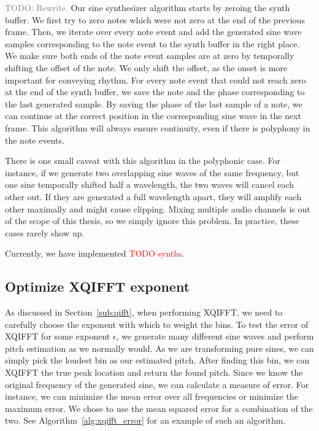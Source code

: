 \documentclass[a4paper,10pt,twocolumn]{article}
\begin{document}
\textcolor{gray}{TODO: Rewrite. }
Our sine synthesizer algorithm starts by zeroing the synth buffer. We first try to zero notes which were not zero at the end of the previous frame. Then, we iterate over every note event and add the generated sine wave samples corresponding to the note event to the synth buffer in the right place. We make sure both ends of the note event samples are at zero by temporally shifting the offset of the note. We only shift the offset, as the onset is more important for conveying rhythm. For every note event that could not reach zero at the end of the synth buffer, we save the note and the phase corresponding to the last generated sample. By saving the phase of the last sample of a note, we can continue at the correct position in the corresponding sine wave in the next frame. This algorithm will always ensure continuity, even if there is polyphony in the note events.

There is one small caveat with this algorithm in the polyphonic case. For instance, if we generate two overlapping sine waves of the same frequency, but one sine temporally shifted half a wavelength, the two waves will cancel each other out. If they are generated a full wavelength apart, they will amplify each other maximally and might cause clipping. Mixing multiple audio channels is out of the scope of this thesis, so we simply ignore this problem. In practice, these cases rarely show up.


Currently, we have implemented \textcolor{red}{TODO synths}. %


\subsection{Optimize XQIFFT exponent}  \label{sub:opt_xqfft}
As discussed in Section~\ref{sub:qifft}, when performing XQIFFT, we need to carefully choose the exponent with which to weight the bins. To test the error of XQIFFT for some exponent $\epsilon$, we generate many different sine waves and perform pitch estimation as we normally would. As we are transforming pure sines, we can simply pick the loudest bin as our estimated pitch. After finding this bin, we can XQIFFT the true peak location and return the found pitch. Since we know the original frequency of the generated sine, we can calculate a measure of error. For instance, we can minimize the mean error over all frequencies or minimize the maximum error. We chose to use the mean squared error for a combination of the two. See Algorithm~\ref{alg:xqifft_error} for an example of such an algorithm.

\end{document}
